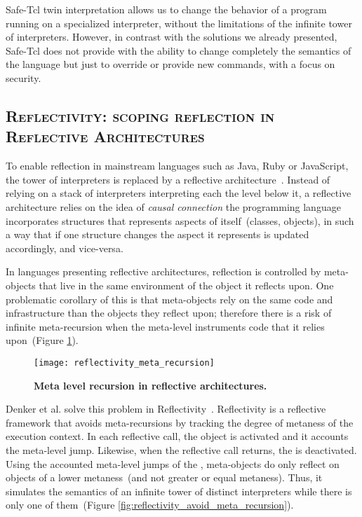 Safe-Tcl twin interpretation allows us to change the behavior of a program running on a specialized interpreter, without the limitations of the infinite tower of interpreters. However, in contrast with the solutions we already presented, Safe-Tcl does not provide with the ability to change completely the semantics of the language but just to override or provide new commands, with a focus on security.

\subsection*{\textsc{Reflectivity: scoping reflection in Reflective Architectures}}

To enable reflection in mainstream languages such as Java, Ruby or JavaScript, the tower of interpreters is replaced by a reflective architecture~\cite{Maes87a}. Instead of relying on a stack of interpreters interpreting each the level below it, a reflective architecture relies on the idea of \emph{causal connection} \ie the programming language incorporates structures that represents aspects of itself~(\eg classes, objects), in such a way that if one structure changes the aspect it represents is updated accordingly, and vice-versa.


In languages presenting reflective architectures, reflection is controlled by meta-objects that live in the same environment of the object it reflects upon.
One problematic corollary of this is that meta-objects rely on the same code and infrastructure than the objects they reflect upon; therefore there is a risk of infinite meta-recursion when the meta-level instruments code that it relies upon~(Figure \ref{fig:reflectivity_meta_recursion}).

\begin{figure}[ht]
\begin{center}
\texttt{[image: reflectivity\_meta\_recursion]}
\caption{\textbf{Meta level recursion in reflective architectures.}\label{fig:reflectivity_meta_recursion}
 }
\end{center}
\end{figure}

Denker et al. solve this problem in Reflectivity~\cite{Denk08b}. Reflectivity is a reflective framework that avoids meta-recursions by tracking the degree of metaness of the execution context. In each reflective call, the  object is activated and it accounts the meta-level jump. Likewise, when the reflective call returns, the  is deactivated. Using the accounted meta-level jumps of the , meta-objects do only reflect on objects of a lower metaness~(and not greater or equal metaness). Thus, it simulates the semantics of an infinite tower of distinct interpreters while there is only one of them~(Figure \ref{fig:reflectivity_avoid_meta_recursion}).

